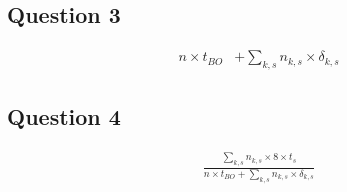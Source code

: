 \subsection{Question 3}
\begin{align*}
n\times t_{BO} &+ \displaystyle\sum_{k,s} n_{k,s} \times \delta_{k,s}
\end{align*}

\subsection{Question 4}
\begin{align*}
\frac{\displaystyle\sum_{k,s} n_{k,s} \times 8 \times t_s}{n\times t_{BO} +
    \displaystyle\sum_{k,s} n_{k,s} \times \delta_{k,s}}
\end{align*}
